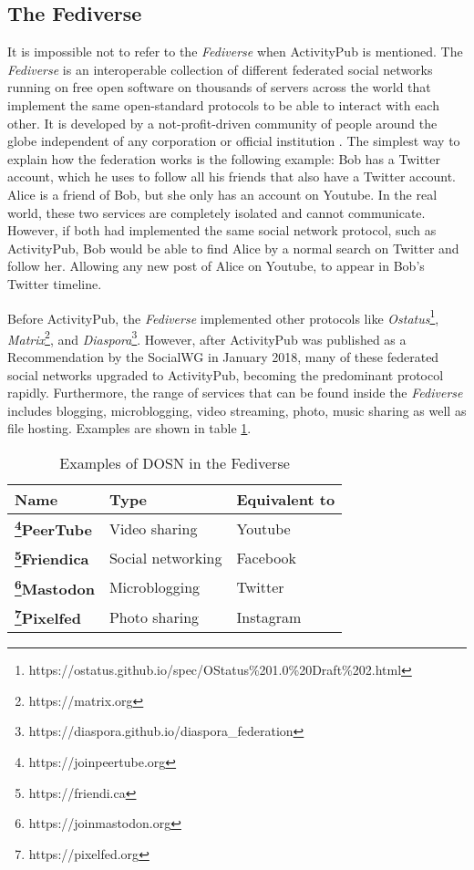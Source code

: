 \subsection{The Fediverse}

It is impossible not to refer to the \emph{Fediverse} when ActivityPub is mentioned. The \emph{Fediverse} is an interoperable collection of different federated social networks running on free open software on thousands of servers across the world that implement the same open-standard protocols to be able to interact with each other. It is developed by a not-profit-driven community of people around the globe independent of any corporation or official institution \cite{holloway_2018} \cite{https://doi.org/10.48550/arxiv.1909.05801}. The simplest way to explain how the federation works is the following example: Bob has a Twitter account, which he uses to follow all his friends that also have a Twitter account. Alice is a friend of Bob, but she only has an account on Youtube. In the real world, these two services are completely isolated and cannot communicate. However, if both had implemented the same social network protocol, such as ActivityPub, Bob would be able to find Alice by a normal search on Twitter and follow her. Allowing any new post of Alice on Youtube, to appear in Bob's Twitter timeline.

Before ActivityPub, the \emph{Fediverse} implemented other protocols like \emph{Ostatus}\footnote{https://ostatus.github.io/spec/OStatus\%201.0\%20Draft\%202.html}, \emph{Matrix}\footnote{https://matrix.org}, and \emph{Diaspora}\footnote{https://diaspora.github.io/diaspora\_federation}. However, after ActivityPub was published as a Recommendation by the SocialWG in January 2018, many of these federated social networks upgraded to ActivityPub, becoming the predominant protocol rapidly. Furthermore, the range of services that can be found inside the \emph{Fediverse} includes blogging, microblogging, video streaming, photo, music sharing as well as file hosting. Examples are shown in table \ref{table:fediverse_examples}.

\begin{table}[H]
  \centering
  \begin{tabular}{|p{4cm}|p{4cm}|p{4cm}| }
    \hline
    \textbf{Name} & \textbf{Type} & \textbf{
      Equivalent to} \\
    \hline
    \hline
    \textbf{\footnote{https://joinpeertube.org}PeerTube} & Video sharing  & Youtube \\
    \textbf{\footnote{https://friendi.ca}Friendica} & Social networking & Facebook \\ 
    \textbf{\footnote{https://joinmastodon.org}Mastodon} & Microblogging & Twitter \\
    \textbf{\footnote{https://pixelfed.org}Pixelfed} & Photo sharing & Instagram \\
      \hline
  \end{tabular}
  \caption{Examples of DOSN in the Fediverse}
  \label{table:fediverse_examples}
\end{table}


